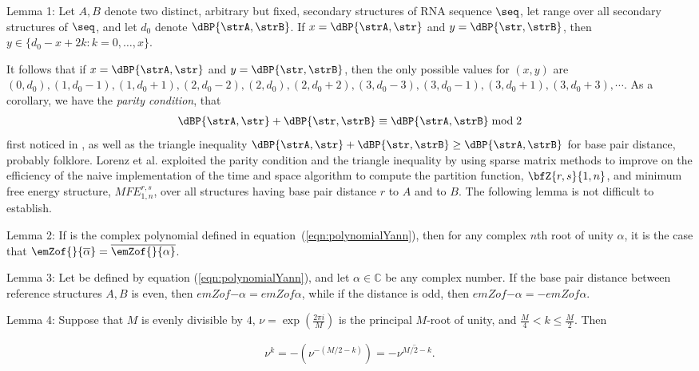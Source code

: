 \noindent
{\sc Lemma 1:} Let $A,B$ denote two distinct, arbitrary but fixed,
 secondary structures of RNA sequence $\seq$, let \str range over
all secondary structures of $\seq$, and let $d_0$ denote $\dBP{\strA,\strB}$.
If $x=\dBP{\strA,\str}$ and $y=\dBP{\str,\strB}$, then
$y \in \{ d_0-x+2k: k=0,\ldots,x\}$.
\medskip

\noindent
It follows that if $x=\dBP{\strA,\str}$ and $y=\dBP{\str,\strB}$,
then the only possible values for
$(x,y)$ are $(0,d_0), (1,d_0-1), (1,d_0+1),
(2,d_0-2), (2,d_0), (2, d_0+2),
(3,d_0-3), (3,d_0-1), (3, d_0+1), (3,d_0+3), \cdots$.
As a corollary, we have the {\em parity condition}, that
\begin{align}
\label{eqn:parity}
\dBP{\strA,\str} + \dBP{\str,\strB} \equiv \dBP{\strA,\strB} \bmod 2
\end{align}
first noticed in \cite{hofacker:RNAbor2D}, as well as
the triangle inequality
$\dBP{\strA,\str} + \dBP{\str,\strB} \geq \dBP{\strA,\strB}$
for base pair distance, probably folklore.
Lorenz et al. \cite{hofacker:RNAbor2D} exploited the parity condition
and the triangle inequality by using sparse matrix methods to improve on
the efficiency of the naive  implementation of the
 time and  space algorithm to compute
the partition function, $\bfZ{r,s}{1,n}$,
and minimum free energy structure, $MFE^{r,s}_{1,n}$, over all
structures having base pair distance $r$ to $A$ and \str to $B$.
The following lemma is not difficult to establish.
\medskip

\noindent
{\sc Lemma 2:} If \emZ{} is the complex polynomial defined in
equation~(\ref{eqn:polynomialYann}), then for any complex $n$th root of
unity $\alpha$, it is the case that $\emZof{}{\overline{\alpha}} =
\overline{\emZof{}{\alpha}}$.
\medskip

\noindent
{\sc Lemma 3:}
Let \emZ{} be defined by equation (\ref{eqn:polynomialYann}), and
let $\alpha \in \mathbb{C}$ be any complex number.
If the base pair distance between reference
structures $A,B$ is even, then $emZof{}{-\alpha} = emZof{}{\alpha}$, while if
the distance is odd, then $emZof{}{-\alpha} = -emZof{}{\alpha}$.
\medskip

\noindent
{\sc Lemma 4:} Suppose that $M$ is evenly divisible by $4$,
$\nu = \exp(\frac{2 \pi i}{M})$ is the principal $M$-root of unity, and
$\frac{M}{4} < k \leq \frac{M}{2}$. Then

\begin{align}
\nu^k = -(\nu^{-(M/2-k)}) = - \overline{\nu^{M/2-k}}.
\end{align}
\medskip

